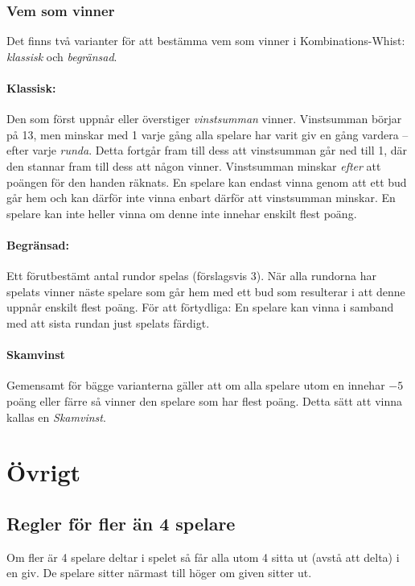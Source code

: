 \documentclass[a4paper]{article}
\begin{document}
	\subsubsection{Vem som vinner}
	\label{sec:winning}
	Det finns två varianter för att bestämma vem som vinner i Kombinations-Whist: \emph{klassisk} och \emph{begränsad}.

	\paragraph{Klassisk:}
	Den som först uppnår eller överstiger \emph{vinstsumman} vinner. Vinstsumman börjar på 13, men minskar med 1 varje gång alla spelare har varit giv en gång vardera -- efter varje \emph{runda}. Detta fortgår fram till dess att vinstsumman går ned till 1, där den stannar fram till dess att någon vinner. Vinstsumman minskar \emph{efter} att poängen för den handen räknats. En spelare kan endast vinna genom att ett bud går hem och kan därför inte vinna enbart därför att vinstsumman minskar. En spelare kan inte heller vinna om denne inte innehar enskilt flest poäng.

	\paragraph{Begränsad:}
	Ett förutbestämt antal rundor spelas (förslagsvis 3). När alla rundorna har spelats vinner näste spelare som går hem med ett bud som resulterar i att denne uppnår enskilt flest poäng. För att förtydliga: En spelare kan vinna i samband med att sista rundan just spelats färdigt.

	\paragraph{Skamvinst} Gemensamt för bägge varianterna gäller att om alla spelare utom en innehar $-5$ poäng eller färre så vinner den spelare som har flest poäng. Detta sätt att vinna kallas en \emph{Skamvinst}.

	\section{Övrigt}
	\subsection{Regler för fler än 4 spelare}
	Om fler är 4 spelare deltar i spelet så får alla utom 4 sitta ut (avstå att delta) i en giv. De spelare sitter närmast till höger om given sitter ut.
		
\end{document}
